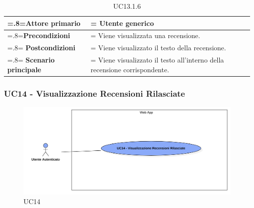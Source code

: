             \begin{table}[H]
                \centering
                \renewcommand{\arraystretch}{1.8}
                \renewcommand\tabularxcolumn[1]{m{#1}}
                \begin{tabularx}{0.9\textwidth} {
                    >{\hsize=.8\hsize\linewidth=\hsize}X
                    >{\hsize=1.2\hsize\linewidth=\hsize}X}
                    \hline
                    \textbf{Attore primario} & Utente generico \\
                    \hline
                    \textbf{Precondizioni} & Viene visualizzata una recensione. \\
                    \hline
                    \textbf{Postcondizioni} & Viene visualizzato il testo della recensione. \\
                    \hline
                    \textbf{Scenario principale} & Viene visualizzato il testo all'interno della recensione corrispondente. \\
                    \hline
                \end{tabularx}
                \caption{UC13.1.6}
            \end{table}

        \subsubsection{UC14 - Visualizzazione Recensioni Rilasciate}
        \label{UC14}

            \begin{figure}[H]
                \centering
                \includegraphics[scale=0.4]{src/img/UC14.png}
                \caption{UC14}
            \end{figure}

